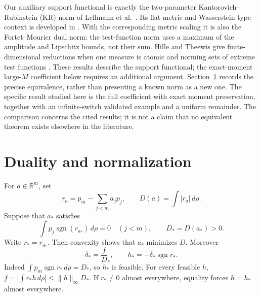 \documentclass[11pt,a4paper]{article}
\numberwithin{equation}{section}
\theoremstyle{remark}\newtheorem{remark}[theorem]{Remark}
\DeclareMathOperator{\sgn}{sgn}
\newcommand{\R}{\mathbb R}
\newcommand{\ds}{\delta_*}
\newcommand{\Ds}{D_*}
\newcommand{\rs}{r_*}
\newcommand{\norm}[1]{\lVert#1\rVert}
\begin{document}
Our auxiliary support functional is exactly the two-parameter
Kantorovich--Rubinstein (KR) norm of Lellmann et al.\ \cite{lellmann}.
Its flat-metric and Wasserstein-type context is developed in
\cite{piccoli,schmitzer}. With the corresponding metric scaling it is also
the Fortet--Mourier dual norm: the test-function norm uses a maximum of
the amplitude and Lipschitz bounds, not their sum. Hille and Theewis
give finite-dimensional reductions when one measure is atomic
\cite[Theorem 2.1]{hille2023} and norming sets of extreme test functions
\cite[Theorem 5.1 and Corollary 5.1]{hille2024}. These results describe
the support functional; the exact-moment large-$M$ coefficient below
requires an additional argument. Section~\ref{sec:dual} records the precise
equivalence, rather than presenting a known norm as a new one. The specific
result studied here is the full coefficient with exact moment preservation,
together with an infinite-switch validated example and a uniform remainder.
The comparison concerns the cited results; it is not a claim that no
equivalent theorem exists elsewhere in the literature.

\section{Duality and normalization}\label{sec:dual}
For $a\in\R^m$, set
\begin{equation}
 r_a=p_m-\sum_{j<m}a_jp_j,\qquad D(a)=\int|r_a|\,d\rho.\label{eq:residual}
\end{equation}
Suppose that $a_*$ satisfies
\begin{equation}
 \int p_j\sgn(r_{a_*})\,d\rho=0\quad(j<m),\qquad
 \Ds=D(a_*)>0.\label{eq:signmoments}
\end{equation}
Write $\rs=r_{a_*}$. Then convexity shows that $a_*$ minimizes $D$.
Moreover
\begin{equation}
 \ds=\frac f\Ds,\qquad h_*=-\ds\sgn\rs.\label{eq:bangbang}
\end{equation}
Indeed $\int p_m\sgn\rs\,d\rho=\Ds$, so $h_*$ is feasible. For every
feasible $h$, $f=|\int\rs h\,d\rho|\le\norm h_\infty\Ds$.
If $\rs\ne0$ almost everywhere, equality forces $h=h_*$ almost everywhere.
\end{document}

